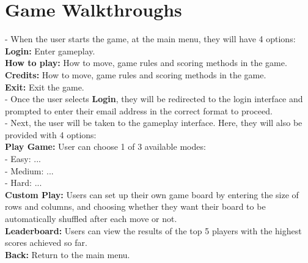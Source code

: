 \documentclass[12pt,a4paper]{report}
\begin{document}
\newpage
\section{Game Walkthroughs}
- When the user starts the game, at the main menu, they will have 4 options:\\
\indent\textbullet\textbf{ Login:} Enter gameplay.\\
\indent\textbullet\textbf{ How to play:} How to move, game rules and scoring methods in the game.\\
\indent\textbullet\textbf{ Credits:} How to move, game rules and scoring methods in the game.\\
\indent\textbullet\textbf{ Exit:} Exit the game.\\[0.2cm]
- Once the user selects \textbf{Login}, they will be redirected to the login interface and prompted to enter their email address in the correct format to proceed.\\
\hspace{-0.6cm}- Next, the user will be taken to the gameplay interface. Here, they will also be provided with 4 options:\\
\indent\textbullet\textbf{ Play Game:} User can choose 1 of 3 available modes:\\
\indent\indent- Easy: ...\\
\indent\indent- Medium: ...\\
\indent\indent- Hard: ...\\
\indent\textbullet\textbf{ Custom Play:} Users can set up their own game board by entering the size of rows and columns, and choosing whether they want their board to be automatically shuffled after each move or not.\\
\indent\textbullet\textbf{ Leaderboard:} Users can view the results of the top 5 players with the highest scores achieved so far.\\
\indent\textbullet\textbf{ Back:} Return to the main menu.\\[0.2cm]
\end{document}
